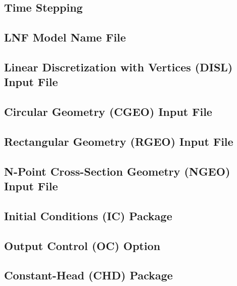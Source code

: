 \subsection{Time Stepping}


\newpage
\subsection{LNF Model Name File}


\newpage
\subsection{Linear Discretization with Vertices (DISL) Input File}


\newpage
\subsection{Circular Geometry (CGEO) Input File}


\newpage
\subsection{Rectangular Geometry (RGEO) Input File}


\newpage
\subsection{N-Point Cross-Section Geometry (NGEO) Input File}


\newpage
\subsection{Initial Conditions (IC) Package}


\newpage
\subsection{Output Control (OC) Option}


\newpage
\subsection{Constant-Head (CHD) Package}



